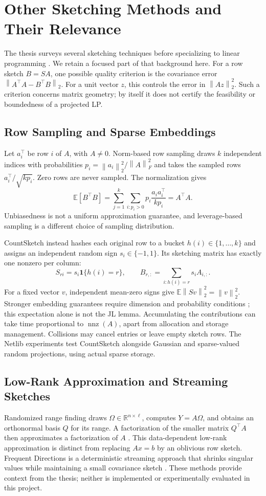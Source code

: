 \documentclass[12pt,letterpaper,oneside]{report}
\theoremstyle{definition}
\newcommand{\R}{\mathbb{R}}
\newcommand{\E}{\mathbb{E}}
\newcommand{\norm}[1]{\left\lVert #1\right\rVert}
\begin{document}
\section{Other Sketching Methods and Their Relevance}
The thesis surveys several sketching techniques before specializing to
linear programming \cite[pp.~6--16]{thesis2025}. We retain a focused part
of that background here. For a row sketch $B=SA$, one possible quality
criterion is the covariance error $\norm{A^\top A-B^\top B}_2$.
For a unit vector $z$, this controls the error in $\norm{Az}_2^2$.
Such a criterion concerns matrix geometry; by itself it does not certify
the feasibility or boundedness of a projected LP.

\subsection{Row Sampling and Sparse Embeddings}
Let $a_i^\top$ be row $i$ of $A$, with $A\ne0$. Norm-based row sampling
draws $k$ independent indices with probabilities
$p_i=\norm{a_i}_2^2/\norm{A}_F^2$ and takes the sampled rows
$a_i^\top/\sqrt{kp_i}$. Zero rows are never sampled. The normalization gives
\[
\E[B^\top B]=\sum_{j=1}^k\sum_{i:p_i>0}
p_i\frac{a_i a_i^\top}{kp_i}=A^\top A.
\]
Unbiasedness is not a uniform approximation guarantee, and leverage-based
sampling is a different choice of sampling distribution.

CountSketch instead hashes each original row to a bucket
$h(i)\in\{1,\ldots,k\}$ and assigns an independent random sign
$s_i\in\{-1,1\}$. Its sketching matrix has exactly one nonzero per column:
\[
S_{ri}=s_i\mathbf{1}\{h(i)=r\},\qquad
B_{r,:}=\sum_{i:h(i)=r}s_i A_{i,:}.
\]
For a fixed vector $v$, independent mean-zero signs give
$\E\norm{Sv}_2^2=\norm{v}_2^2$. Stronger embedding guarantees require
dimension and probability conditions \cite{clarkson2013}; this expectation
alone is not the JL lemma. Accumulating the contributions can take time
proportional to $\operatorname{nnz}(A)$, apart from allocation and storage
management. Collisions may cancel entries or leave empty sketch rows.
The Netlib experiments test CountSketch alongside Gaussian and
sparse-valued random projections, using actual sparse storage.

\subsection{Low-Rank Approximation and Streaming Sketches}
Randomized range finding draws $\Omega\in\R^{n\times\ell}$, computes
$Y=A\Omega$, and obtains an orthonormal basis $Q$ for its range.
A factorization of the smaller matrix $Q^\top A$ then approximates a
factorization of $A$ \cite{halko2011}. This data-dependent low-rank
approximation is distinct from replacing $Ax=b$ by an oblivious row sketch.
Frequent Directions is a deterministic streaming approach that shrinks
singular values while maintaining a small covariance sketch
\cite{ghashami2016}. These methods provide context from the thesis;
neither is implemented or experimentally evaluated in this project.
\end{document}
